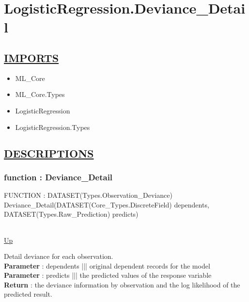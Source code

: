 \chapter*{LogisticRegression.Deviance\_Detail}
\hypertarget{LogisticRegression.Deviance_Detail}{}

\section*{\underline{IMPORTS}}
\begin{itemize}
\item ML\_Core
\item ML\_Core.Types
\item LogisticRegression
\item LogisticRegression.Types
\end{itemize}

\section*{\underline{DESCRIPTIONS}}
\subsection*{function : Deviance\_Detail}
\hypertarget{ecldoc:logisticregression.deviance_detail}{FUNCTION : DATASET(Types.Observation\_Deviance) Deviance\_Detail(DATASET(Core\_Types.DiscreteField) dependents, DATASET(Types.Raw\_Prediction) predicts)} \\
\hyperlink{ecldoc:}{Up} \\
\par
Detail deviance for each observation. \\
\textbf{Parameter} : dependents ||| original dependent records for the model \\
\textbf{Parameter} : predicts ||| the predicted values of the response variable \\
\textbf{Return} : the deviance information by observation and the log likelihood of the predicted result. \\

